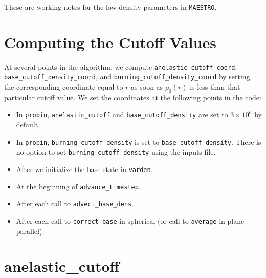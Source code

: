 These are working notes for the low density parameters in {\tt MAESTRO}.

\section{Computing the Cutoff Values}

At several points in the algorithm, we compute {\tt anelastic\_cutoff\_coord}, 
{\tt base\_cutoff\_density\_coord}, and {\tt burning\_cutoff\_density\_coord} by 
setting the corresponding coordinate equal to $r$ as soon as $\rho_0(r)$ is less than 
that particular cutoff value.  We set the coordinates at the following points in the
code:

\begin{itemize}

\item In {\tt probin}, {\tt anelastic\_cutoff} and {\tt base\_cutoff\_density} are
  set to $3\times 10^6$ by default.

\item In {\tt probin}, {\tt burning\_cutoff\_density} is set to 
  {\tt base\_cutoff\_density}.  There is no option to set 
  {\tt burning\_cutoff\_density} using the inputs file.

\item After we initialize the base state in {\tt varden}.

\item At the beginning of {\tt advance\_timestep}.

\item After each call to {\tt advect\_base\_dens}.

\item After each call to {\tt correct\_base} in spherical 
  (or call to {\tt average} in plane-parallel).

\end{itemize}

\section{anelastic\_cutoff}\label{Sec:Anelastic Cutoff}

